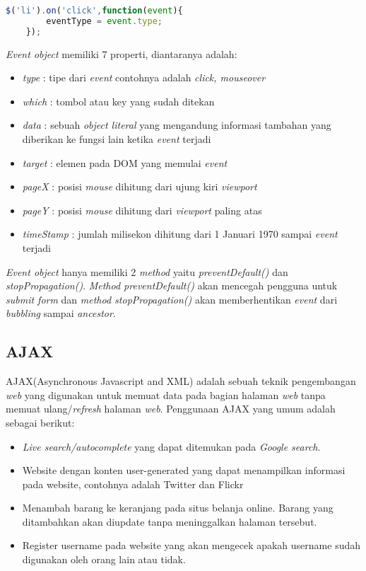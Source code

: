 \begin{lstlisting}[language=Javascript, caption=Mendapatkan tipe \textit{event} dari \textit{event object}, label={lst:jQuery11}]
	$('li').on('click',function(event){
		eventType = event.type;
	});
\end{lstlisting}

\textit{Event object} memiliki 7 properti, diantaranya adalah:

\begin{itemize}
	\item \textit{type} : tipe dari \textit{event} contohnya adalah \textit{click, mouseover}
	\item \textit{which} : tombol atau key yang sudah ditekan
	\item \textit{data} : sebuah \textit{object literal} yang mengandung informasi tambahan yang diberikan ke fungsi lain ketika \textit{event} terjadi
	\item \textit{target} : elemen pada DOM yang memulai \textit{event}
	\item \textit{pageX} : posisi \textit{mouse} dihitung dari ujung kiri \textit{viewport} 
	\item \textit{pageY} : posisi \textit{mouse} dihitung dari \textit{viewport} paling atas
	\item \textit{timeStamp} : jumlah milisekon dihitung dari 1 Januari 1970 sampai \textit{event} terjadi
\end{itemize}

\textit{Event object} hanya memiliki 2 \textit{method} yaitu \textit{preventDefault()} dan \textit{stopPropagation()}. \textit{Method preventDefault()} akan mencegah pengguna untuk \textit{submit form} dan \textit{method stopPropagation()} akan memberhentikan \textit{event} dari \textit{bubbling} sampai \textit{ancestor}.

\subsection{AJAX}
AJAX(Asynchronous Javascript and XML) adalah sebuah teknik pengembangan \textit{web} yang digunakan untuk memuat data pada bagian halaman \textit{web} tanpa memuat ulang/\textit{refresh} halaman \textit{web}. Penggunaan AJAX yang umum adalah sebagai berikut:

\begin{itemize}
	\item \textit{Live search/autocomplete} yang dapat ditemukan pada \textit{Google search}.
	\item Website dengan konten user-generated yang dapat menampilkan informasi pada website, contohnya adalah Twitter dan Flickr
	\item Menambah barang ke keranjang pada situs belanja online. Barang yang ditambahkan akan diupdate tanpa meninggalkan halaman tersebut.
	\item Register username pada website yang akan mengecek apakah username sudah digunakan oleh orang lain atau tidak.
\end{itemize}

